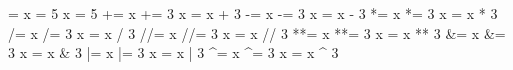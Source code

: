 = 	x = 5 		x = 5 	
+= 	x += 3 		x = x + 3 	
-= 	x -= 3 		x = x - 3 	
*= 	x *= 3 		x = x * 3 	
/= 	x /= 3 		x = x / 3 	
//= 	x //= 3 	x = x // 3 	
**= 	x **= 3 	x = x ** 3 	
&= 	x &= 3 		x = x & 3 	
|= 	x |= 3 		x = x | 3 	
^= 	x ^= 3 		x = x ^ 3
